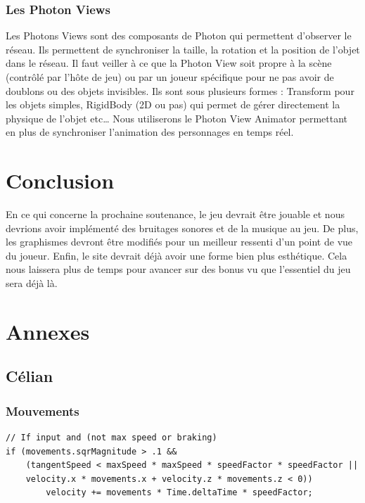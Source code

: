 \documentclass{article}
\begin{document}
\subsubsection{Les Photon Views}

Les Photons Views sont des composants de Photon qui permettent d’observer le réseau. Ils permettent de synchroniser la taille, la rotation et la position de l’objet dans le réseau. Il faut veiller à ce que la Photon View soit propre à la scène (contrôlé par l’hôte de jeu) ou par un joueur spécifique pour ne pas avoir de doublons ou des objets invisibles.
Ils sont sous plusieurs formes : Transform pour les objets simples, RigidBody (2D ou pas) qui permet de gérer directement la physique de l’objet etc… Nous utiliserons le Photon View Animator permettant en plus de synchroniser l’animation des personnages en temps réel.


\section{Conclusion}

En ce qui concerne la prochaine soutenance, le jeu devrait être jouable et nous devrions avoir implémenté des bruitages sonores et de la musique au jeu. De plus, les graphismes devront être modifiés pour un meilleur ressenti d’un point de vue du joueur. Enfin, le site devrait déjà avoir une forme bien plus esthétique. Cela nous laissera plus de temps pour avancer sur des bonus vu que l'essentiel du jeu sera déjà là.


\newpage
\section{Annexes}


\subsection{Célian}
\subsubsection{Mouvements}
\label{Mouvements}
\begin{lstlisting}
// If input and (not max speed or braking)
if (movements.sqrMagnitude > .1 &&
    (tangentSpeed < maxSpeed * maxSpeed * speedFactor * speedFactor ||
    velocity.x * movements.x + velocity.z * movements.z < 0))
        velocity += movements * Time.deltaTime * speedFactor;
\end{lstlisting}
\end{document}
